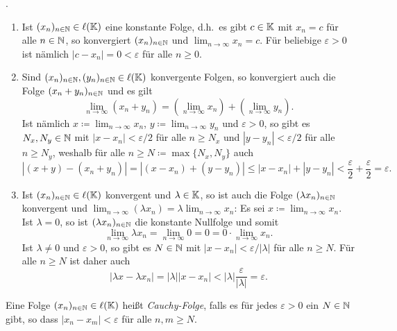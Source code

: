\begin{bem}\label{bem: properties of convergent sequences}.
 \begin{enumerate}[leftmargin=*]
  \item
   Ist $(x_n)_{n \in \mathbb{N}} \in \ell(\mathbb{K})$ eine konstante Folge, d.h.\ es gibt $c \in \mathbb{K}$ mit $x_n = c$ für alle $n \in \mathbb{N}$, so konvergiert $(x_n)_{n \in \mathbb{N}}$ und $\lim_{n \to \infty} x_n = c$. Für beliebige $\varepsilon > 0$ ist nämlich $|c-x_n| = 0 < \varepsilon$ für alle $n \geq 0$.
  \item
   Sind $(x_n)_{n \in \mathbb{N}}, (y_n)_{n \in \mathbb{N}} \in \ell(\mathbb{K})$ konvergente Folgen, so konvergiert auch die Folge $(x_n + y_n)_{n \in \mathbb{N}}$ und es gilt
   \[
    \lim_{n \to \infty} (x_n + y_n)
    = \left( \lim_{n \to \infty} x_n \right) + \left( \lim_{n \to \infty} y_n \right).
   \]
   Ist nämlich $x \coloneqq \lim_{n \to \infty} x_n$, $y \coloneqq \lim_{n \to \infty} y_n$ und $\varepsilon > 0$, so gibt es $N_x, N_y \in \mathbb{N}$ mit $|x-x_n| < \varepsilon/2$ für alle $n \geq N_x$ und $|y-y_n| < \varepsilon/2$ für alle $n \geq N_y$, weshalb für alle $n \geq N \coloneqq \max\{N_x, N_y\}$ auch
   \[
    |(x+y)-(x_n+y_n)|
    = |(x-x_n) + (y-y_n)|
    \leq |x - x_n| + |y - y_n|
    < \frac{\varepsilon}{2} + \frac{\varepsilon}{2}
    = \varepsilon.
   \]
  \item
   Ist $(x_n)_{n \in \mathbb{N}} \in \ell(\mathbb{K})$ konvergent und $\lambda \in \mathbb{K}$, so ist auch die Folge $(\lambda x_n)_{n \in \mathbb{N}}$ konvergent und $\lim_{n \to \infty} (\lambda x_n) = \lambda \lim_{n \to \infty} x_n$: Es sei $x \coloneqq \lim_{n \to \infty} x_n$. Ist $\lambda = 0$, so ist $(\lambda x_n)_{n \in \mathbb{N}}$ die konstante Nullfolge und somit
   \[
    \lim_{n \to \infty} \lambda x_n
    = \lim_{n \to \infty} 0
    = 0
    = 0 \cdot \lim_{n \to \infty} x_n.
   \]
   Ist $\lambda \neq 0$ und $\varepsilon > 0$, so gibt es $N \in \mathbb{N}$ mit $|x-x_n| < \varepsilon/|\lambda|$ für alle $n \geq N$. Für alle $n \geq N$ ist daher auch
   \[
    |\lambda x - \lambda x_n|
    = |\lambda| |x-x_n|
    < |\lambda| \frac{\varepsilon}{|\lambda|}
    = \varepsilon.
   \]
 \end{enumerate}
\end{bem}


\begin{defi}
 Eine Folge $(x_n)_{n \in \mathbb{N}} \in \ell(\mathbb{K})$ heißt \emph{Cauchy-Folge}, falls es für jedes $\varepsilon > 0$ ein $N \in \mathbb{N}$ gibt, so dass $|x_n - x_m| < \varepsilon$ für alle $n,m \geq N$.
\end{defi}


